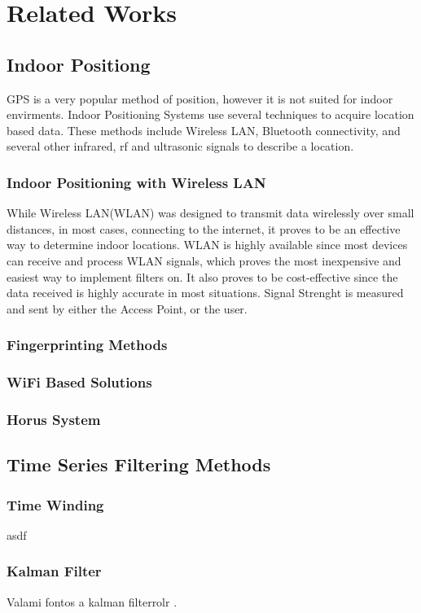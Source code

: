 \chapter{Related Works}
\label{chap:relatedWorks}

\section{Indoor Positiong}
GPS is a very popular method of position, however it is not suited for indoor envirments.
Indoor Positioning Systems use several techniques to acquire location based data.
These methods include Wireless LAN, Bluetooth connectivity, and several other infrared, rf and ultrasonic signals to describe a location.

\subsection{Indoor Positioning with Wireless LAN}
While Wireless LAN(WLAN) was designed to transmit data wirelessly over small distances, in most cases, connecting to the internet, it proves to be an effective way to determine indoor locations. WLAN is highly available since most devices can receive and process WLAN signals, which proves the most inexpensive and easiest way to implement filters on. It also proves to be cost-effective since the data received is highly accurate in most situations. Signal Strenght is measured and sent by either the Access Point, or the user. 

\subsection{Fingerprinting Methods}

\subsection{WiFi Based Solutions}

\subsection{Horus System}

\section{Time Series Filtering Methods}
\subsection{Time Winding}


asdf \cite{camp2008ieee}


\subsection{Kalman Filter}

Valami fontos a kalman filterrolr \cite{wan2000unscented}. 
